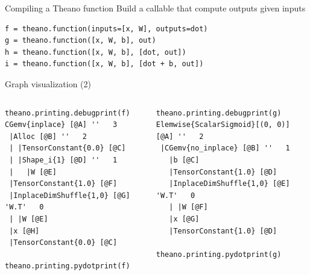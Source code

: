 \documentclass[a4paper,9pt]{beamer}
\begin{document}
\begin{frame}[fragile]{Compiling a Theano function}
  Build a callable that compute outputs given inputs
  \begin{verbatim}
f = theano.function(inputs=[x, W], outputs=dot)
g = theano.function([x, W, b], out)
h = theano.function([x, W, b], [dot, out])
i = theano.function([x, W, b], [dot + b, out])
  \end{verbatim}
\end{frame}

\begin{frame}[fragile]{Graph visualization (2)}
  \begin{columns}
    \begin{column}{0.48\textwidth}
\footnotesize
      \begin{verbatim}
theano.printing.debugprint(f)
CGemv{inplace} [@A] ''   3
 |Alloc [@B] ''   2
 | |TensorConstant{0.0} [@C]
 | |Shape_i{1} [@D] ''   1
 |   |W [@E]
 |TensorConstant{1.0} [@F]
 |InplaceDimShuffle{1,0} [@G] 'W.T'   0
 | |W [@E]
 |x [@H]
 |TensorConstant{0.0} [@C]

theano.printing.pydotprint(f)
      \end{verbatim}
    \end{column}
    \begin{column}{0.48\textwidth}
\footnotesize
      \begin{verbatim}
theano.printing.debugprint(g)
Elemwise{ScalarSigmoid}[(0, 0)] [@A] ''   2
 |CGemv{no_inplace} [@B] ''   1
   |b [@C]
   |TensorConstant{1.0} [@D]
   |InplaceDimShuffle{1,0} [@E] 'W.T'   0
   | |W [@F]
   |x [@G]
   |TensorConstant{1.0} [@D]

theano.printing.pydotprint(g)
      \end{verbatim}
    \end{column}
  \end{columns}
\end{frame}
\end{document}
